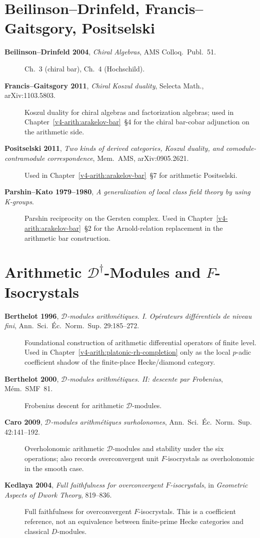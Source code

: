 \section{Beilinson--Drinfeld, Francis--Gaitsgory, Positselski}
\label{v4-arith:app:A:beilinson-etc}

\begin{description}
\item[\textbf{Beilinson--Drinfeld 2004}, \emph{Chiral Algebras},
AMS Colloq.~Publ.~51.] Ch.~3 (chiral bar), Ch.~4 (Hochschild).
\item[\textbf{Francis--Gaitsgory 2011}, \emph{Chiral Koszul
duality}, Selecta Math., arXiv:1103.5803.] Koszul duality for
chiral algebras and factorization algebras; used in
Chapter~\ref{v4-arith:arakelov-bar}~\S4 for the chiral
bar-cobar adjunction on the arithmetic side.
\item[\textbf{Positselski 2011}, \emph{Two kinds of derived
categories, Koszul duality, and comodule-contramodule
correspondence}, Mem.~AMS, arXiv:0905.2621.] Used in
Chapter~\ref{v4-arith:arakelov-bar}~\S7 for arithmetic Positselski.
\item[\textbf{Parshin--Kato 1979--1980}, \emph{A generalization of
local class field theory by using K-groups}.] Parshin reciprocity
on the Gersten complex. Used in
Chapter~\ref{v4-arith:arakelov-bar}~\S2 for the Arnold-relation
replacement in the arithmetic bar construction.
\end{description}

\section{Arithmetic \(\mathcal{D}^{\dagger}\)-Modules and \(F\)-Isocrystals}
\label{v4-arith:app:A:arith-Ddagger}

\begin{description}
\item[\textbf{Berthelot 1996}, \emph{\(\mathcal{D}\)-modules
arithm\'etiques. I. Op\'erateurs diff\'erentiels de niveau fini},
Ann.~Sci.~\'Ec.~Norm.~Sup. 29:185--272.] Foundational construction
of arithmetic differential operators of finite level. Used in
Chapter~\ref{v4-arith:platonic-rh-completion} only as the local
\(p\)-adic coefficient shadow of the finite-place Hecke/diamond
category.
\item[\textbf{Berthelot 2000}, \emph{\(\mathcal{D}\)-modules
arithm\'etiques. II: descente par Frobenius}, M\'em.~SMF~81.]
Frobenius descent for arithmetic \(\mathcal{D}\)-modules.
\item[\textbf{Caro 2009}, \emph{\(\mathcal{D}\)-modules arithm\'etiques
surholonomes}, Ann.~Sci.~\'Ec.~Norm.~Sup. 42:141--192.]
Overholonomic arithmetic \(\mathcal{D}\)-modules and stability under
the six operations; also records overconvergent unit
\(F\)-isocrystals as overholonomic in the smooth case.
\item[\textbf{Kedlaya 2004}, \emph{Full faithfulness for
overconvergent \(F\)-isocrystals}, in \emph{Geometric Aspects of Dwork
Theory}, 819--836.] Full faithfulness for overconvergent
\(F\)-isocrystals. This is a coefficient reference, not an equivalence
between finite-prime Hecke categories and classical \(D\)-modules.
\end{description}

